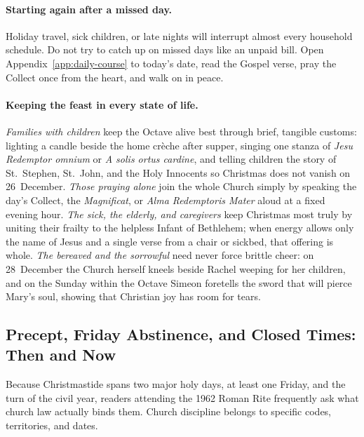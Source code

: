\paragraph{Starting again after a missed day.}
Holiday travel, sick children, or late nights will interrupt almost every
household schedule. Do not try to catch up on missed days like an unpaid bill.
Open Appendix~\ref{app:daily-course} to today's date, read the Gospel verse,
pray the Collect once from the heart, and walk on in peace.

\paragraph{Keeping the feast in every state of life.}
\textit{Families with children} keep the Octave alive best through brief,
tangible customs: lighting a candle beside the home cr\`eche after supper,
singing one stanza of \textit{Jesu Redemptor omnium} or \textit{A solis ortus
cardine}, and telling children the story of St.~Stephen, St.~John, and the Holy
Innocents so Christmas does not vanish on 26~December. \textit{Those praying
alone} join the whole Church simply by speaking the day's Collect, the
\textit{Magnificat}, or \textit{Alma Redemptoris Mater} aloud at a fixed evening
hour. \textit{The sick, the elderly, and caregivers} keep Christmas most truly
by uniting their frailty to the helpless Infant of Bethlehem; when energy allows
only the name of Jesus and a single verse from a chair or sickbed, that offering
is whole. \textit{The bereaved and the sorrowful} need never force brittle
cheer: on 28~December the Church herself kneels beside Rachel weeping for her
children, and on the Sunday within the Octave Simeon foretells the sword that
will pierce Mary's soul, showing that Christian joy has room for tears.

\subsection{Precept, Friday Abstinence, and Closed Times: Then and Now}

Because Christmastide spans two major holy days, at least one Friday, and the
turn of the civil year, readers attending the 1962 Roman Rite frequently ask
what church law actually binds them. Church discipline belongs to specific
codes, territories, and dates.

